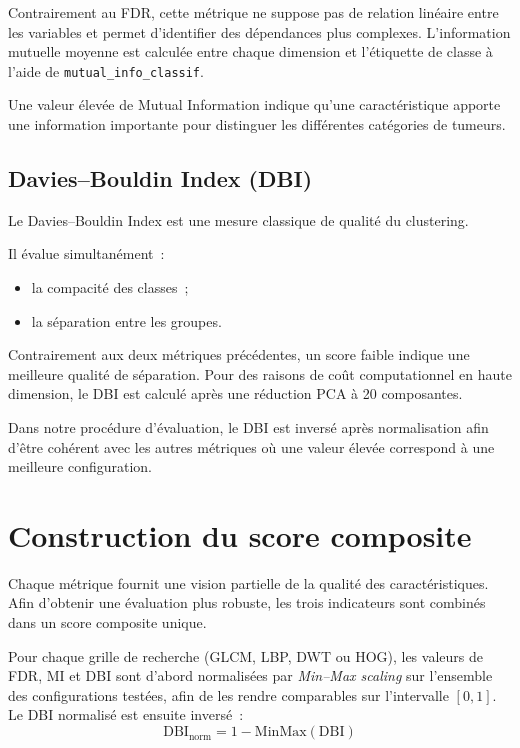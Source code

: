 Contrairement au FDR, cette métrique ne suppose pas de relation linéaire entre les variables
et permet d'identifier des dépendances plus complexes. L'information mutuelle moyenne est
calculée entre chaque dimension et l'étiquette de classe à l'aide de
\texttt{mutual\_info\_classif}.

Une valeur élevée de Mutual Information indique qu'une caractéristique apporte une
information importante pour distinguer les différentes catégories de tumeurs.

\subsection{Davies--Bouldin Index (DBI)}

Le Davies--Bouldin Index est une mesure classique de qualité du clustering.

Il évalue simultanément~:
\begin{itemize}[leftmargin=1.4em,itemsep=2pt]
  \item la compacité des classes~;
  \item la séparation entre les groupes.
\end{itemize}

Contrairement aux deux métriques précédentes, un score faible indique une meilleure qualité
de séparation. Pour des raisons de coût computationnel en haute dimension, le DBI est
calculé après une réduction PCA à 20 composantes.

Dans notre procédure d'évaluation, le DBI est inversé après normalisation afin d'être
cohérent avec les autres métriques où une valeur élevée correspond à une meilleure
configuration.

\section{Construction du score composite}

Chaque métrique fournit une vision partielle de la qualité des caractéristiques. Afin
d'obtenir une évaluation plus robuste, les trois indicateurs sont combinés dans un score
composite unique.

Pour chaque grille de recherche (GLCM, LBP, DWT ou HOG), les valeurs de FDR, MI et DBI sont
d'abord normalisées par \emph{Min--Max scaling} sur l'ensemble des configurations testées,
afin de les rendre comparables sur l'intervalle $[0,1]$. Le DBI normalisé est ensuite
inversé~:
\begin{equation}
  \mathrm{DBI}_{\mathrm{norm}} = 1 - \mathrm{MinMax}(\mathrm{DBI})
\end{equation}

